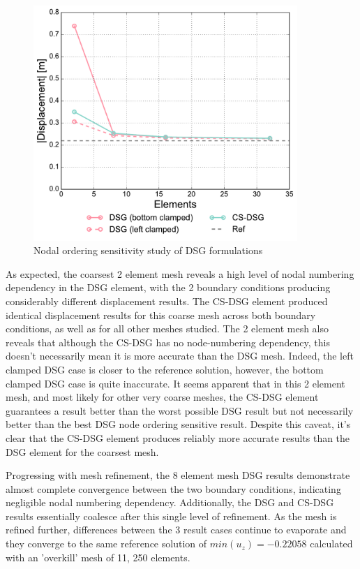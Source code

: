 \begin{figure}[H]
	\centering
	\includegraphics[width=10cm]{images/node_ordering_study.pdf}
	\caption{Nodal ordering sensitivity study of DSG formulations}
	\label{fig:Nodal ordering sensitivity study}
\end{figure}

As expected, the coarsest 2 element mesh reveals a high level of nodal numbering dependency in the DSG element, with the 2 boundary conditions producing considerably different displacement results. The CS-DSG element produced identical displacement results for this coarse mesh across both boundary conditions, as well as for all other meshes studied. The 2 element mesh also reveals that although the CS-DSG has no node-numbering dependency, this doesn't necessarily mean it is more accurate than the DSG mesh. Indeed, the left clamped DSG case is closer to the reference solution, however, the bottom clamped DSG case is quite inaccurate. It seems apparent that in this 2 element mesh, and most likely for other very coarse meshes, the CS-DSG element guarantees a result better than the worst possible DSG result but not necessarily better than the best DSG node ordering sensitive result. Despite this caveat, it's clear that the CS-DSG element produces reliably more accurate results than the DSG element for the coarsest mesh.

Progressing with mesh refinement, the 8 element mesh DSG results demonstrate almost complete convergence between the two boundary conditions, indicating negligible nodal numbering dependency. Additionally, the DSG and CS-DSG results essentially coalesce after this single level of refinement. As the mesh is refined further, differences between the 3 result cases continue to evaporate and they converge to the same reference solution of $min(u_z) = -0.22058$ calculated with an 'overkill' mesh of 11, 250 elements.


